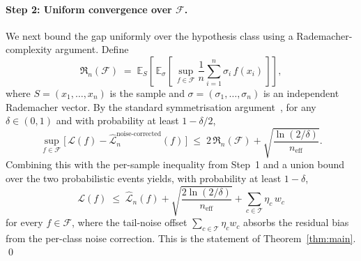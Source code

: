 \documentclass[11pt]{article}
\begin{document}
\paragraph{Step 2: Uniform convergence over $\mathcal{F}$.} We next bound the gap uniformly over the hypothesis class using a Rademacher-complexity argument. Define
\begin{equation}
\mathfrak{R}_n(\mathcal{F}) \;=\; \mathbb{E}_S \!\left[\, \mathbb{E}_\sigma \!\left[\, \sup_{f \in \mathcal{F}} \frac{1}{n} \sum_{i=1}^{n} \sigma_i \, f(x_i) \,\right] \right], \label{eq:rademacher}
\end{equation}
where $S = (x_1, \ldots, x_n)$ is the sample and $\sigma = (\sigma_1, \ldots, \sigma_n)$ is an independent Rademacher vector. By the standard symmetrisation argument~\cite{shalev2014understanding}, for any $\delta \in (0, 1)$ and with probability at least $1 - \delta/2$,
\[
\sup_{f \in \mathcal{F}} \bigl[\, \mathcal{L}(f) - \hat{\mathcal{L}}_n^{\mathrm{noise\text{-}corrected}}(f) \,\bigr] \;\le\; 2\, \mathfrak{R}_n(\mathcal{F}) + \sqrt{\frac{\ln(2/\delta)}{n_{\mathrm{eff}}}}.
\]
Combining this with the per-sample inequality from Step~1 and a union bound over the two probabilistic events yields, with probability at least $1 - \delta$,
\[
\mathcal{L}(f) \;\le\; \hat{\mathcal{L}}_n(f) + \sqrt{\frac{2\ln(2/\delta)}{n_{\mathrm{eff}}}} + \sum_{c \in \mathcal{T}} \eta_c\, w_c
\]
for every $f \in \mathcal{F}$, where the tail-noise offset $\sum_{c \in \mathcal{T}} \eta_c w_c$ absorbs the residual bias from the per-class noise correction. This is the statement of Theorem~\ref{thm:main}. \qed
\end{document}
